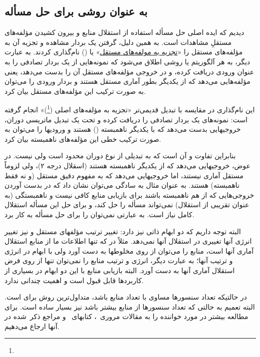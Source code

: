 \subsection{ به عنوان روشی برای حل مسأله }
دیدیم که ایده اصلی حل مسأله 
استفاده از  استقلال منابع و بیرون کشیدن مؤلفه‌های مستقلِ
مشاهدات است. به همین دلیل، گرفتن یک بردار مشاهده و تجزیه آن به مؤلفه‌های مستقل را
«\underline{تجزیه به مولفه‌های مستقل}» 
یا () نام‌گذاری کردند. به عبارت دیگر،
 به هر آلگوریتم یا روشی اطلاق می‌شود که نمونه‌هایی از یک بردار تصادفی را به عنوان ورودی  
دریافت کرده، و در خروجی مؤلفه‌های مستقل آن را بدست می‌دهد، یعنی مؤلفه‌هایی می‌دهد که از یکدیگر
بطور آماری  مستقل هستند و بردار ورودی را می‌توان به صورت ترکیب این مؤلفه‌های مستقل بیان کرد.

این نام‌گذاری در مقایسه با تبدیل قدیمی‌تر «تجزیه به مؤلفه‌های اصلی 
(\footnote{})» انجام گرفته است:  نمونه‌های یک بردار تصادفی را
دریافت کرده و تحت یک تبدیل ماتریسی دوران، خروجیهایی بدست می‌دهد که با یکدیگر ناهمبسته ()
هستند و ورودیها را می‌توان به صورت ترکیب خطی این مؤلفه‌های ناهمبسته بیان کرد.

بنابراین تفاوت  و  آن است که  به تبدیلی از نوع دوران محدود است ولی  نیست. در عوض،
 خروجیهایی می‌دهد که از یکدیگر ناهمبسته هستند (اسقلال درجه ۲)، ولی لزوماً مستقل آماری نیستند، اما
 خروجیهایی می‌دهد که به مفهوم دقیق مستقل (و نه فقط ناهمبسته) هستند. 
به عنوان مثال به سادگی می‌توان نشان داد که 
در  بدست آوردن خروجی‌هایی که از هم ناهمبسته باشند برای بازیابی منابع کافی نیست و ناهمبستگی (به عنوان
تقریبی از استقلال) نمی‌تواند مسأله  را حل کند، و برای حل این مسأله استقلال کامل نیاز است. به عبارتی
نمی‌توان  را برای حل مسأله  به کار برد.

البته توجه داریم که  دو ابهام ذاتی نیز دارد: تغییر ترتیب مؤلفهای مستقل و نیز تغییر انرژی آنها
تغییری در استقلال آنها نمی‌دهد. مثلاً در  که تنها اطلاعات ما از منابع استقلال آماری آنها است، 
منابع را می‌توان از روی مخلوطها به دست آورد ولی با ابهام در انرژی و ترتیب آنها؛ به عبارت دیگر،
انرژی و ترتیب منابع را نمی‌توان تنها از روی فرض استقلال آماری آنها به دست آورد. البته 
بازیابی منابع با این دو ابهام
در بسیاری از کاربردها قابل قبول است  و اهمیت چندانی ندارد.

در حالتیکه تعداد سنسورها مساوی با تعداد منابع باشد،  متداول‌ترین روش برای  است. البته تعمیم 
 به حالتی که تعداد سنسورها از منابع بیشتر باشد نیز بسیار ساده است.
برای مطالعه بیشتر در مورد  خواننده را به 
مقالات مروری~\cite{MansBO00,LeeGBS99,HyvaO00,Hyva99Survey,Card98}، 
کتابهای~\cite{CichA02,HyvaKO01} و مراجع ذکر~شده در آنها ارجاع می‌دهیم.


